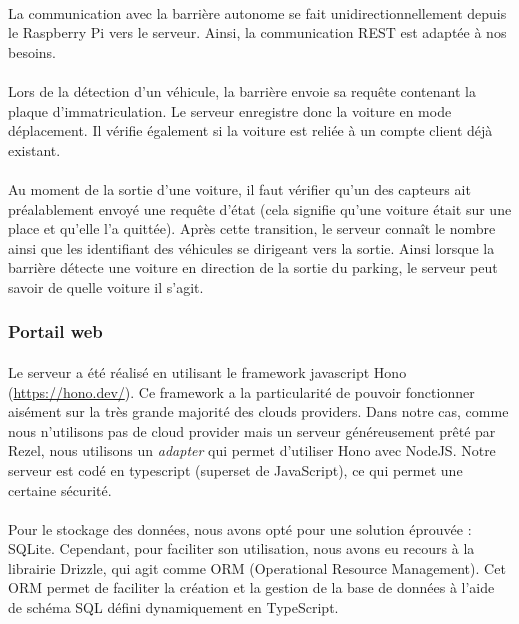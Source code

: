 \paragraph*{}
La communication avec la barrière autonome se fait unidirectionnellement depuis le Raspberry Pi vers le serveur. Ainsi, la communication REST est adaptée à nos besoins.

\paragraph*{}
Lors de la détection d'un véhicule, la barrière envoie sa requête contenant la plaque d'immatriculation. Le serveur enregistre donc la voiture en mode déplacement. Il vérifie également si la voiture est reliée à un compte client déjà existant.

\paragraph*{}
Au moment de la sortie d'une voiture, il faut vérifier qu'un des capteurs ait préalablement envoyé une requête d'état (cela signifie qu'une voiture était sur une place et qu'elle l'a quittée). Après cette transition, le serveur connaît le nombre ainsi que les identifiant des véhicules se dirigeant vers la sortie. Ainsi lorsque la barrière détecte une voiture en direction de la sortie du parking, le serveur peut savoir de quelle voiture il s'agit.


\subsubsection*{Portail web}

\paragraph*{}
Le serveur a été réalisé en utilisant le framework javascript Hono (\url{https://hono.dev/}). Ce framework a la particularité de pouvoir fonctionner aisément sur la très grande majorité des clouds providers. Dans notre cas, comme nous n'utilisons pas de cloud provider mais un serveur généreusement prêté par Rezel, nous utilisons un \textit{adapter} qui permet d'utiliser Hono avec NodeJS. Notre serveur est codé en typescript (superset de JavaScript), ce qui permet une certaine sécurité.

\paragraph*{}
Pour le stockage des données, nous avons opté pour une solution éprouvée : SQLite. Cependant, pour faciliter son utilisation, nous avons eu recours à la librairie Drizzle, qui agit comme ORM (Operational Resource Management). Cet ORM permet de faciliter la création et la gestion de la base de données à l'aide de schéma SQL défini dynamiquement en TypeScript.

